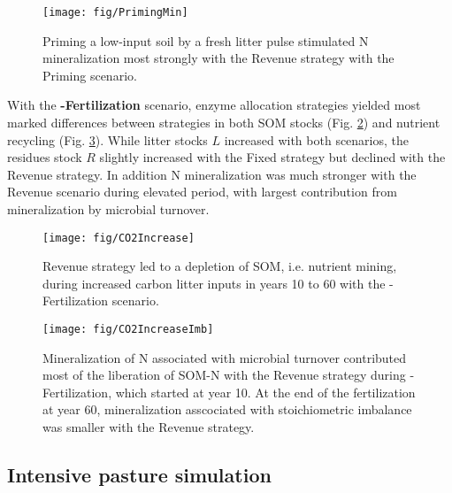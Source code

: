 \begin{figure}[t]
\vspace*{2mm}
\begin{center}
\texttt{[image: fig/PrimingMin]}
\end{center}
\caption{Priming a low-input soil by a fresh litter pulse stimulated N
mineralization most strongly with the Revenue strategy with the Priming scenario.
\label{fig:PrimingMin}}
\end{figure}

With the \textbf{-Fertilization} scenario, enzyme allocation strategies
yielded most marked differences between strategies in both SOM stocks (Fig.
\ref{fig:CO2Increase}) and nutrient recycling (Fig. \ref{fig:CO2IncreaseImb}).
While litter stocks $L$ increased with both scenarios, the residues stock $R$
slightly increased with the Fixed strategy but declined with the Revenue strategy. In
addition N mineralization was much stronger with the Revenue scenario during
elevated  period, with largest contribution from mineralization by
microbial turnover.

\begin{figure}[t] \vspace*{2mm}
\begin{center}
\texttt{[image: fig/CO2Increase]}
\end{center}
\caption{
Revenue strategy led to a depletion of SOM, i.e.
nutrient mining, during increased carbon litter inputs
in years 10 to 60 with the -Fertilization scenario.
\label{fig:CO2Increase}}

\end{figure}
\begin{figure}[t] \vspace*{2mm}
\begin{center}
\texttt{[image: fig/CO2IncreaseImb]} 
\end{center}
\caption{
Mineralization of N associated with microbial turnover 
contributed most of the liberation of SOM-N with the Revenue strategy during
-Fertilization, which started at year 10.
At the end of the fertilization at year 60, mineralization asscociated 
with stoichiometric imbalance was smaller with the Revenue strategy.
\label{fig:CO2IncreaseImb}}
\end{figure}

\subsection{Intensive pasture simulation}
\label{sec:ResultsPasture}


